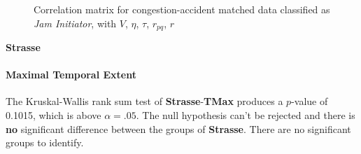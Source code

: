 \begin{figure}[!ht]
	\centering
	\caption{Correlation matrix for congestion-accident matched data classified as \textit{Jam Initiator}, with $V$, $\eta$, $\tau$, $r_{pq}$, $r$}
	\label{img:correlation_matrix_selected_initiator_cramers}
\end{figure}

\Large
\centerline{\textbf{Strasse}}
\normalsize

\paragraph{Maximal Temporal Extent}
The Kruskal-Wallis rank sum test of \textbf{Strasse}-\textbf{TMax} produces a $p$-value of 0.1015, which is above $\alpha=.05$. The null hypothesis can't be rejected and there is \textbf{no} significant difference between the groups of \textbf{Strasse}. There are no significant groups to identify.

